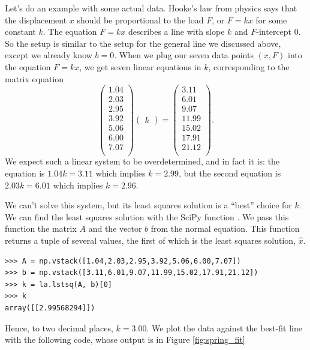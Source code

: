 Let's do an example with some actual data.
Hooke's law from physics says that the displacement $x$ should be proportional to the load $F$, or $F = kx$ for some constant $k$.
The equation $F=kx$ describes a line with slope $k$ and $F$-intercept 0.
So the setup is similar to the setup for the general line we discussed above, except we already know $b=0$.
When we plug our seven data points $(x,F)$ into the equation $F=kx$, we get seven linear equations in $k$, corresponding to the matrix equation
\[
\begin{pmatrix}
1.04\\
2.03\\
2.95\\
3.92\\
5.06\\
6.00\\
7.07\\
\end{pmatrix}
\begin{pmatrix}k\end{pmatrix} =
\begin{pmatrix}
3.11\\
6.01\\
9.07\\
11.99\\
15.02\\
17.91\\
21.12\\
\end{pmatrix}.
\]
We expect such a linear system to be overdetermined, and in fact it is: the equation is $1.04k = 3.11$ which implies $k=2.99$, but the second equation is $2.03k = 6.01$ which implies $k=2.96$.

We can't solve this system, but its least squares solution is a ``best'' choice for $k$.
We can find the least squares solution with the SciPy function . We pass this function the matrix $A$ and the vector $b$ from the normal equation.
This function returns a tuple of several values, the first of which is the least squares solution, $\widehat{x}$.

\begin{lstlisting}
>>> A = np.vstack([1.04,2.03,2.95,3.92,5.06,6.00,7.07])
>>> b = np.vstack([3.11,6.01,9.07,11.99,15.02,17.91,21.12])
>>> k = la.lstsq(A, b)[0]
>>> k
array([[2.99568294]])
\end{lstlisting}

Hence, to two decimal places, $k = 3.00$.
We plot the data against the best-fit line with the following code, whose output is in Figure \ref{fig:spring_fit}

